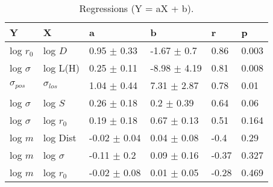 \begin{table}
\centering
\caption{Regressions (Y = aX + b).}
\begin{tabular}{llllll}
\toprule
              Y &               X &                 a &                 b &      r &      p \\
\midrule
      log $r_0$ &         log $D$ &   0.95 $\pm$ 0.33 &   -1.67 $\pm$ 0.7 &   0.86 &  0.003 \\
   log $\sigma$ &        log L(H) &   0.25 $\pm$ 0.11 &  -8.98 $\pm$ 4.19 &   0.81 &  0.008 \\
 $\sigma_{pos}$ &  $\sigma_{los}$ &   1.04 $\pm$ 0.44 &   7.31 $\pm$ 2.87 &   0.78 &   0.01 \\
   log $\sigma$ &         log $S$ &   0.26 $\pm$ 0.18 &    0.2 $\pm$ 0.39 &   0.64 &   0.06 \\
   log $\sigma$ &     log $r_{0}$ &   0.19 $\pm$ 0.18 &   0.67 $\pm$ 0.13 &   0.51 &  0.164 \\
        log $m$ &        log Dist &  -0.02 $\pm$ 0.04 &   0.04 $\pm$ 0.08 &   -0.4 &   0.29 \\
        log $m$ &    log $\sigma$ &   -0.11 $\pm$ 0.2 &   0.09 $\pm$ 0.16 &  -0.37 &  0.327 \\
        log $m$ &     log $r_{0}$ &  -0.02 $\pm$ 0.08 &   0.01 $\pm$ 0.05 &  -0.28 &  0.469 \\
\bottomrule
\end{tabular}
\end{table}
